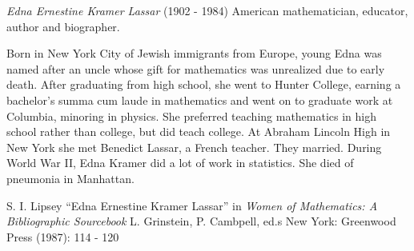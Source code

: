 \documentclass[12pt]{article}
\begin{document}
\emph{Edna Ernestine Kramer Lassar} (1902 - 1984) American mathematician, educator, author and biographer.

Born in New York City of Jewish immigrants from Europe, young Edna was named after an uncle whose gift for mathematics was unrealized due to early death. After graduating from high school, she went to Hunter College, earning a bachelor's  summa cum laude in mathematics and went on to graduate work at Columbia, minoring in physics. She preferred teaching mathematics in high school rather than college, but  did teach college. At Abraham Lincoln High in New York she met Benedict Lassar, a French teacher. They married. During World War II, Edna Kramer did a lot of work in statistics. She died of pneumonia in Manhattan.

\begin{thebibliography}{1}
 S. I. Lipsey ``Edna Ernestine Kramer Lassar'' in {\it Women of Mathematics: A Bibliographic Sourcebook} L. Grinstein, P. Cambpell, ed.s New York: Greenwood Press (1987): 114 - 120
\end{thebibliography}
\end{document}
